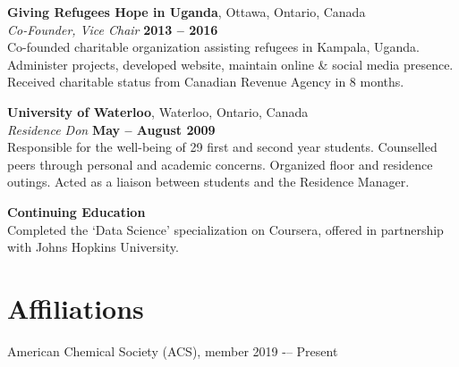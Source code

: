 \documentclass[margin,line]{resumecls}
\begin{document}
\begin{resume}
    \textbf{Giving Refugees Hope in Uganda}, Ottawa, Ontario, Canada\\\vspace{1mm}%
    \textsl{Co-Founder, Vice Chair} \hfill \textbf{2013 -- 2016}\\
    Co-founded charitable organization assisting refugees in Kampala, Uganda.
    Administer projects, developed website, maintain online \& social media presence.
    Received charitable status from Canadian Revenue Agency in 8 months.

    \textbf{University of Waterloo}, Waterloo, Ontario, Canada\\\vspace{1mm}%
    \textsl{Residence Don} \hfill \textbf{May -- August 2009}\\
    Responsible for the well-being of 29 first and second year students.
    Counselled peers through personal and academic concerns.
    Organized floor and residence outings.
    Acted as a liaison between students and the Residence Manager.

    \textbf{Continuing Education}\\
    Completed the `Data Science' specialization on Coursera, offered in partnership with Johns Hopkins University.

\vspace{1mm}
    \section{\mysidestyle Affiliations}

    American Chemical Society (ACS), member 2019 -– Present


\end{resume}
\end{document}
